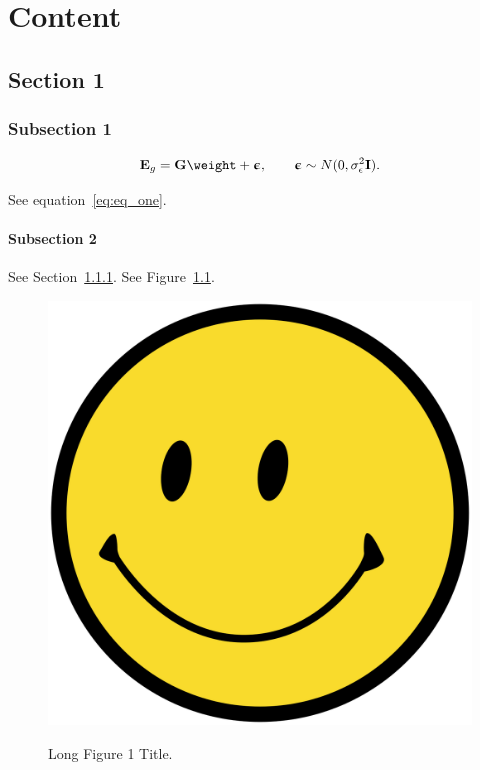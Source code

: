 \chapter{Content} \label{ch:content}

\lipsum[10]

\section{Section 1} \label{sec:sec1}

\subsection{Subsection 1} \label{sec:sec1_subsec1}

\lipsum[11]

\begin{equation}
\vec{E}_{g} = \vec{G} \weight + \boldsymbol{\upepsilon}, \qquad \boldsymbol{\upepsilon} \sim N(0, \sigma^2_{\epsilon}\vec{I}).
\label{eq:eq_one}
\end{equation}

\lipsum[12]

See equation~\ref{eq:eq_one}. \lipsum[13]


\subsubsection{Subsection 2} \label{sec:sec1_subsec2}

See Section~\ref{sec:sec1_subsec1}. See Figure~\ref{fig:fig1}. \lipsum[14]

\begin{figure}[H]\centering
\caption[Figure 1 Title for Table of Contents.]{Long Figure 1 Title.}
\includegraphics[width=\linewidth]{./figures/smiley_face.png}
\label{fig:fig1}
\end{figure}

